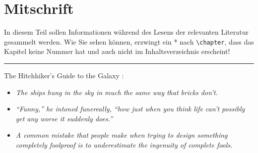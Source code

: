 \chapter*{Mitschrift}
    In diesem Teil sollen Informationen während des Lesens der relevanten Literatur gesammelt werden.
    Wie Sie sehen können, erzwingt ein * nach \texttt{\textbackslash{}chapter}, dass das Kapitel keine Nummer hat und auch nicht im Inhaltsverzeichnis erscheint!
    
    
    
    \bigskip\hrule
    
    The Hitchhiker's Guide to the Galaxy \cite{adams2007hitchhiker}:
    \begin{itemize}
        \item \textit{The ships hung in the sky in much the same way that bricks don't.}
        \item \textit{``Funny,'' he intoned funereally, ``how just when you think life can’t possibly get any worse it suddenly does.''}
        \item \textit{A common mistake that people make when trying to design something completely foolproof is to underestimate the ingenuity of complete fools.}
    \end{itemize}
